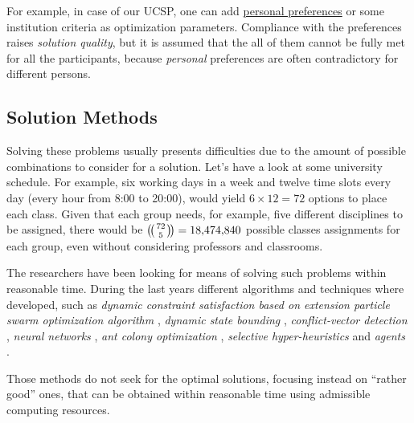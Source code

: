 \documentclass[ThesisDoc]{subfiles}
\begin{document}
  For example, in case of our UCSP,
one can add \underline{personal preferences} or some institution criteria as
optimization parameters.
  Compliance with the preferences raises \emph{solution quality},
but it is assumed that the all of them cannot be fully met for all the
participants, because \emph{personal} preferences are often
contradictory for different persons.

\subsection{Solution Methods}

  Solving these problems usually presents difficulties due to the amount of
possible combinations to consider for a solution. Let's have a look at
some university schedule.
  For example, six working days in a week and twelve time slots every day
(every hour from 8:00 to 20:00), would yield $6 \times 12 = 72$ options
to place each class.
  Given that each group needs, for example, five different disciplines to be assigned,
there would be $\multibinom{72}{5} = \num[group-separator={,}]{18474840}$
possible classes assignments for each group,
even without considering professors and classrooms.

\medskip
\noindent

  The researchers have been looking for means of solving such
problems within reasonable time.
  During the last years different algorithms and techniques where developed,
such as
\emph{dynamic constraint satisfaction based on extension particle swarm
      optimization algorithm} \cite{CSPswarm},
\emph{dynamic state bounding} \cite{CSPdynStateBound},
\emph{conflict-vector detection} \cite{CSPtimetable},
\emph{neural networks} \cite{CSPneuro},
\emph{ant colony optimization} \cite{CSPcunningACO, CSPlimmemACO},
\emph{selective hyper-heuristics} \cite{CSPhypHeur}
and \emph{agents} \cite{CSPagent2013, CSPagent2014, DCSPagent1998}.

\medskip

Those methods do not seek for the optimal solutions, focusing instead on
``rather good'' ones, that can be obtained within reasonable time using admissible
computing resources.
\end{document}
